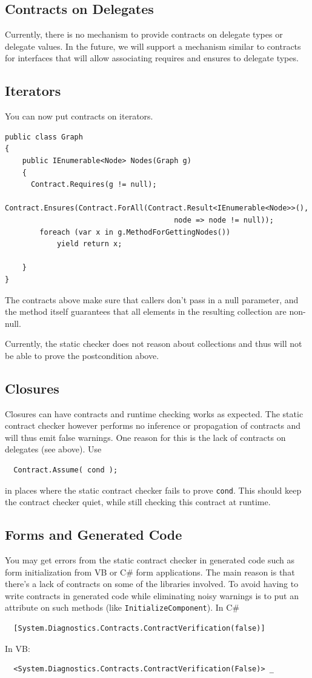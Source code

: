 \documentclass{article}
\newcommand{\code}[1]{\lstinline{#1}}
\begin{document}
\subsection{Contracts on Delegates}
Currently, there is no mechanism to provide contracts on delegate
types or delegate values. In the future, we will support a mechanism
similar to contracts for interfaces that will allow associating requires and
ensures to delegate types.

\subsection{Iterators}
\label{sec:iterators}
You can now put contracts on iterators. 
\begin{lstlisting}
public class Graph
{
    public IEnumerable<Node> Nodes(Graph g)
    {
      Contract.Requires(g != null);
      Contract.Ensures(Contract.ForAll(Contract.Result<IEnumerable<Node>>(),
                                       node => node != null));
        foreach (var x in g.MethodForGettingNodes())
            yield return x;
  
    }
}
\end{lstlisting}
The contracts above make sure that callers don't pass in a null
parameter, and the method itself guarantees that all elements in the
resulting collection are non-null.

Currently, the static checker does not reason about collections and
thus will not be able to prove the postcondition above.

\subsection{Closures}
Closures can have contracts and runtime checking works as
expected. The static contract checker however performs no inference or
propagation of contracts and will thus emit false warnings. One reason
for this is the lack of contracts on delegates (see above). Use 
\begin{lstlisting}
  Contract.Assume( cond );
\end{lstlisting}
in places where the static contract checker fails to prove
\code{cond}. This should keep the contract checker quiet, while still checking this contract at
runtime.

\subsection{Forms and Generated Code}
You may get errors from the static contract checker in generated code
such as form initialization from VB or C\#{} form applications. The
main reason is that there's a lack of contracts on some of the
libraries involved. To avoid having to write contracts in generated
code while eliminating noisy warnings is to put
an attribute on such methods (like \code{InitializeComponent}). In C\#{}
\begin{lstlisting}
  [System.Diagnostics.Contracts.ContractVerification(false)]
\end{lstlisting}
In VB:
\begin{lstlisting}
  <System.Diagnostics.Contracts.ContractVerification(False)> _
\end{lstlisting}
\end{document}
